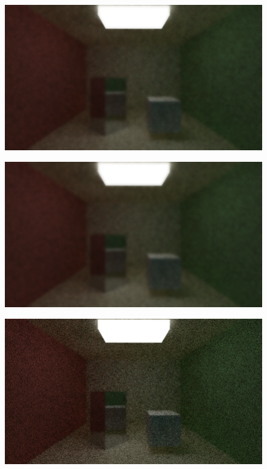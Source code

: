 \documentclass[titlepage,12pt]{report}
\begin{document}
\begin{appendices}
\begin{figure}[H]
	\centering
	\includegraphics[scale=0.5]{media/bilateral/cornell_normal_10_bilateral_filter_21_5_40.png}
	\label{ap19}
\end{figure}

\begin{figure}[H]
	\centering
	\includegraphics[scale=0.5]{media/bilateral/cornell_normal_10_bilateral_filter_21_5_60.png}
	\label{ap20}
\end{figure}	

\begin{figure}[H]
	\centering
	\includegraphics[scale=0.5]{media/bilateral/cornell_normal_10_bilateral_filter_21_10_10.png}
	\label{ap21}
\end{figure}


\end{appendices}
\end{document}
